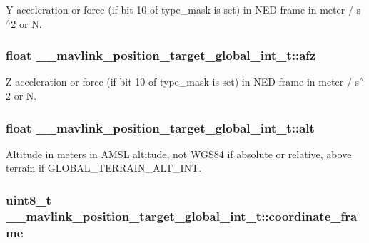 Y acceleration or force (if bit 10 of type\+\_\+mask is set) in N\+E\+D frame in meter / s$^\wedge$2 or N. 

\hypertarget{struct____mavlink__position__target__global__int__t_ad51c1026b3ab247bff29022de4ef5b09}{
\subsubsection[{afz}]{\setlength{\rightskip}{0pt plus 5cm}float \+\_\+\+\_\+mavlink\+\_\+position\+\_\+target\+\_\+global\+\_\+int\+\_\+t\+::afz}}\label{struct____mavlink__position__target__global__int__t_ad51c1026b3ab247bff29022de4ef5b09}


Z acceleration or force (if bit 10 of type\+\_\+mask is set) in N\+E\+D frame in meter / s$^\wedge$2 or N. 

\hypertarget{struct____mavlink__position__target__global__int__t_a26b9bcbff421d309dd3a9a9fc3d717ae}{
\subsubsection[{alt}]{\setlength{\rightskip}{0pt plus 5cm}float \+\_\+\+\_\+mavlink\+\_\+position\+\_\+target\+\_\+global\+\_\+int\+\_\+t\+::alt}}\label{struct____mavlink__position__target__global__int__t_a26b9bcbff421d309dd3a9a9fc3d717ae}


Altitude in meters in A\+M\+S\+L altitude, not W\+G\+S84 if absolute or relative, above terrain if G\+L\+O\+B\+A\+L\+\_\+\+T\+E\+R\+R\+A\+I\+N\+\_\+\+A\+L\+T\+\_\+\+I\+N\+T. 

\hypertarget{struct____mavlink__position__target__global__int__t_aa426aa02f608fe6288daaa788816d72c}{
\subsubsection[{coordinate\+\_\+frame}]{\setlength{\rightskip}{0pt plus 5cm}uint8\+\_\+t \+\_\+\+\_\+mavlink\+\_\+position\+\_\+target\+\_\+global\+\_\+int\+\_\+t\+::coordinate\+\_\+frame}}\label{struct____mavlink__position__target__global__int__t_aa426aa02f608fe6288daaa788816d72c}


